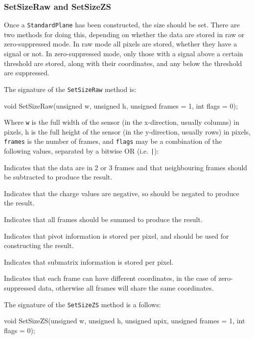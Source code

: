 \subsubsection{SetSizeRaw and SetSizeZS}
Once a \texttt{StandardPlane} has been constructed, the size should be set.
There are two methods for doing this,
depending on whether the data are stored in raw or zero-suppressed mode.
In raw mode all pixels are stored, whether they have a signal or not.
In zero-suppressed mode, only those with a signal above a certain threshold are stored,
along with their coordinates, and any below the threshold are suppressed.

The signature of the \texttt{SetSizeRaw} method is:
\begin{listing}
void SetSizeRaw(unsigned w, unsigned h, unsigned frames = 1, int flags = 0);
\end{listing}

Where \texttt{w} is the full width of the sensor (in the x-direction, usually columns) in pixels,
h is the full height of the sensor (in the y-direction, usually rows) in pixels, \texttt{frames} is the number of frames,
and \texttt{flags} may be a combination of the following values, separated by a bitwise OR (i.e. \texttt{|}):

\begin{description}
 Indicates that the data are in 2 or 3 frames
and that neighbouring frames should be subtracted to produce the result.

 Indicates that the charge values are negative,
so should be negated to produce the result.

 Indicates that all frames should be summed to produce the result.

 Indicates that pivot information is stored per pixel,
and should be used for constructing the result.

 Indicates that submatrix information is stored per pixel.

 Indicates that each frame can have different coordinates,
in the case of zero-suppressed data, otherwise all frames will share the same coordinates.

\end{description}

The signature of the \texttt{SetSizeZS} method is a follows:
\begin{listing}
void SetSizeZS(unsigned w, unsigned h, unsigned npix,
               unsigned frames = 1, int flags = 0);
\end{listing}

